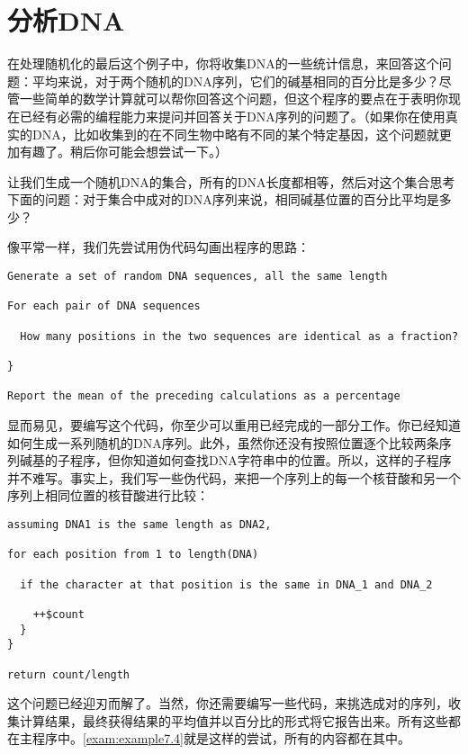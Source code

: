 \section{分析DNA}
在处理随机化的最后这个例子中，你将收集DNA的一些统计信息，来回答这个问题：平均来说，对于两个随机的DNA序列，它们的碱基相同的百分比是多少？尽管一些简单的数学计算就可以帮你回答这个问题，但这个程序的要点在于表明你现在已经有必需的编程能力来提问并回答关于DNA序列的问题了。（如果你在使用真实的DNA，比如收集到的在不同生物中略有不同的某个特定基因，这个问题就更加有趣了。稍后你可能会想尝试一下。）

让我们生成一个随机DNA的集合，所有的DNA长度都相等，然后对这个集合思考下面的问题：对于集合中成对的DNA序列来说，相同碱基位置的百分比平均是多少？

像平常一样，我们先尝试用伪代码勾画出程序的思路：

\begin{lstlisting}
Generate a set of random DNA sequences, all the same length

For each pair of DNA sequences

  How many positions in the two sequences are identical as a fraction?

}

Report the mean of the preceding calculations as a percentage
\end{lstlisting}

显而易见，要编写这个代码，你至少可以重用已经完成的一部分工作。你已经知道如何生成一系列随机的DNA序列。此外，虽然你还没有按照位置逐个比较两条序列碱基的子程序，但你知道如何查找DNA字符串中的位置。所以，这样的子程序并不难写。事实上，我们写一些伪代码，来把一个序列上的每一个核苷酸和另一个序列上相同位置的核苷酸进行比较：

\begin{lstlisting}
assuming DNA1 is the same length as DNA2,

for each position from 1 to length(DNA)

  if the character at that position is the same in DNA_1 and DNA_2

    ++$count
  }
}

return count/length
\end{lstlisting}

这个问题已经迎刃而解了。当然，你还需要编写一些代码，来挑选成对的序列，收集计算结果，最终获得结果的平均值并以百分比的形式将它报告出来。所有这些都在主程序中。\autoref{exam:example7.4}就是这样的尝试，所有的内容都在其中。



